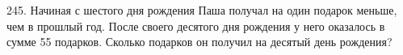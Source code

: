 245. Начиная с шестого дня рождения Паша получал на один подарок меньше, чем в прошлый год. После своего десятого дня рождения у него оказалось в сумме 55 подарков. Сколько подарков он получил на десятый день рождения?\\

